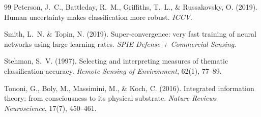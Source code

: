 \documentclass[11pt,a4paper]{article}
\begin{document}
\begin{thebibliography}{99}
Peterson, J.~C., Battleday, R.~M., Griffiths, T.~L., \& Russakovsky, O. (2019).
\newblock Human uncertainty makes classification more robust.
\newblock \emph{ICCV}.

Smith, L.~N. \& Topin, N. (2019).
\newblock Super-convergence: very fast training of neural networks using large learning rates.
\newblock \emph{SPIE Defense + Commercial Sensing}.

Stehman, S.~V. (1997).
\newblock Selecting and interpreting measures of thematic classification accuracy.
\newblock \emph{Remote Sensing of Environment}, 62(1), 77--89.

Tononi, G., Boly, M., Massimini, M., \& Koch, C. (2016).
\newblock Integrated information theory: from consciousness to its physical substrate.
\newblock \emph{Nature Reviews Neuroscience}, 17(7), 450--461.

\end{thebibliography}
\end{document}
